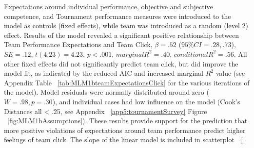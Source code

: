 Expectations around individual performance, objective and subjective competence, and Tournament performance measures were introduced to the model as controls (fixed effects), while team was introduced as a random (level 2) effect.  Results of the model revealed a significant positive relationship between Team Performance Expectations and Team Click, $\beta = .52$ ($95\% CI =  .28, .73$), $SE = .12$, $t(4.23) = 4.23$, $p < .001$, $marginal R^2 = .40$, $conditional R^2 = .56$.  All other fixed effects did not significantly predict team click, but did improve the model fit, as indicated by the reduced AIC and increased marginal $R^2$ value (see Appendix Table ~\ref{tab:MLM1bteamExpectationsClick} for the various iterations of the model).   Model residuals were normally distributed around zero ($W = .98, p = .30$), and individual cases had low influence on the model (Cook's Distances all < .25, see Appendix ~\ref{app5:tournamentSurvey} Figure ~\ref{fig:MLM1bAssumptions}).  These results provide support for the prediction that more positive violations of expectations around team performance predict higher feelings of team click.  The slope of the linear model is included in scatterplot ~\ref{}


  

